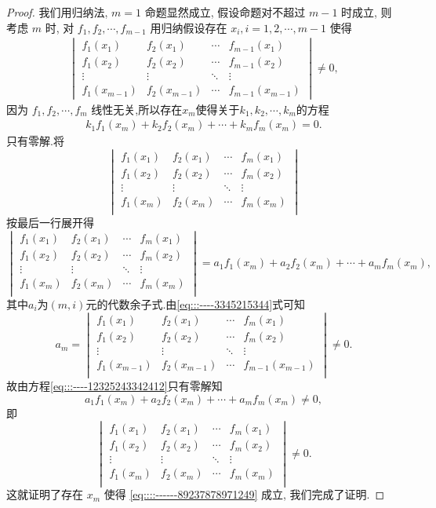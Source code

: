 \documentclass[../../main.tex]{subfiles}%
\begin{document}
\begin{proof}
我们用归纳法, \( m = 1 \) 命题显然成立, 假设命题对不超过 \( m - 1 \) 时成立, 则考虑 \( m \) 时, 对 \( f_1, f_2, \cdots, f_{m - 1} \) 用归纳假设存在 \( x_i, i = 1, 2, \cdots, m - 1 \) 使得
\begin{align}\label{eq:::----3345215344}
\begin{vmatrix}
f_1(x_1) & f_2(x_1) & \cdots & f_{m - 1}(x_1) \\
f_1(x_2) & f_2(x_2) & \cdots & f_{m - 1}(x_2) \\
\vdots & \vdots & \ddots & \vdots \\
f_1(x_{m - 1}) & f_2(x_{m - 1}) & \cdots & f_{m - 1}(x_{m - 1})
\end{vmatrix} \neq 0,
\end{align}
因为 \( f_1, f_2, \cdots, f_m \) 线性无关,所以存在$x_m$使得关于$k_1,k_2,\cdots,k_m$的方程
\begin{align}\label{eq:::----12325243342412}
k_1f_1\left( x_m \right) +k_2f_2\left( x_m \right) +\cdots +k_mf_m\left( x_m \right) =0.
\end{align}
只有零解.将
\[
\begin{vmatrix}
f_1(x_1)&f_2(x_1)&\cdots&f_m(x_1)\\
f_1(x_2)&f_2(x_2)&\cdots&f_m(x_2)\\
\vdots&\vdots&\ddots&\vdots\\
f_1(x_m)&f_2(x_m)&\cdots&f_m(x_m)\\
\end{vmatrix}
\]
按最后一行展开得
\[
\begin{vmatrix}
f_1(x_1)&f_2(x_1)&\cdots&f_m(x_1)\\
f_1(x_2)&f_2(x_2)&\cdots&f_m(x_2)\\
\vdots&\vdots&\ddots&\vdots\\
f_1(x_m)&f_2(x_m)&\cdots&f_m(x_m)\\
\end{vmatrix}=a_1f_1(x_m)+a_2f_2(x_m)+\cdots+a_mf_m(x_m),
\]
其中$a_i$为$(m,i)$元的代数余子式.由\eqref{eq:::----3345215344}式可知
\[
a_m=\begin{vmatrix}
f_1(x_1)&f_2(x_1)&\cdots&f_m(x_1)\\
f_1(x_2)&f_2(x_2)&\cdots&f_m(x_2)\\
\vdots&\vdots&\ddots&\vdots\\
f_1(x_{m-1})&f_2(x_{m-1})&\cdots&f_{m-1}(x_{m-1})\\
\end{vmatrix}\ne 0.
\]
故由方程\eqref{eq:::----12325243342412}只有零解知
\[
a_1f_1(x_m)+a_2f_2(x_m)+\cdots+a_mf_m(x_m)\ne 0,
\]
即
\[
\begin{vmatrix}
f_1(x_1)&f_2(x_1)&\cdots&f_m(x_1)\\
f_1(x_2)&f_2(x_2)&\cdots&f_m(x_2)\\
\vdots&\vdots&\ddots&\vdots\\
f_1(x_m)&f_2(x_m)&\cdots&f_m(x_m)\\
\end{vmatrix}\ne 0.
\]
这就证明了存在 \( x_m \) 使得 \eqref{eq::::------89237878971249} 成立, 我们完成了证明.


\end{proof}
\end{document}
